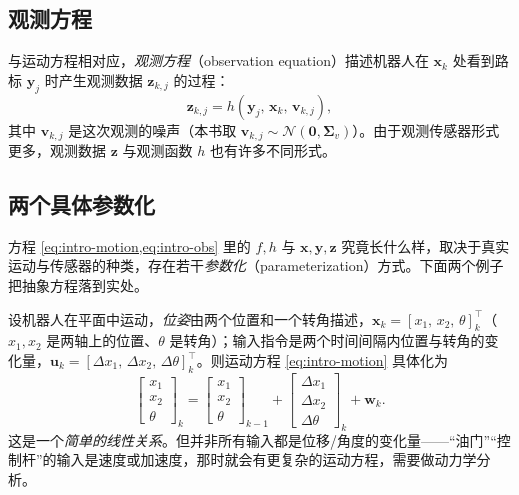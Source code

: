 \subsection{观测方程}
\label{sec:intro-obs}
与运动方程相对应，\emph{观测方程}（observation equation）描述机器人在 $\mathbf{x}_k$ 处看到路标 $\mathbf{y}_j$ 时产生观测数据 $\mathbf{z}_{k,j}$ 的过程\cite{gaoxiang2019slam14}：
\begin{equation}
  \mathbf{z}_{k,j} = h\!\left(\mathbf{y}_j,\, \mathbf{x}_k,\, \mathbf{v}_{k,j}\right),
  \label{eq:intro-obs}
\end{equation}
其中 $\mathbf{v}_{k,j}$ 是这次观测的噪声（本书取 $\mathbf{v}_{k,j}\sim\mathcal{N}(\mathbf{0},\boldsymbol{\Sigma}_v)$）。由于观测传感器形式更多，观测数据 $\mathbf{z}$ 与观测函数 $h$ 也有许多不同形式。

\subsection{两个具体参数化}
\label{sec:intro-param}
方程 \cref{eq:intro-motion,eq:intro-obs} 里的 $f,h$ 与 $\mathbf{x},\mathbf{y},\mathbf{z}$ 究竟长什么样，取决于真实运动与传感器的种类，存在若干\emph{参数化}（parameterization）方式\cite{gaoxiang2019slam14}。下面两个例子把抽象方程落到实处。

\begin{example}\label{ex:intro-planar}
设机器人在平面中运动，\emph{位姿}由两个位置和一个转角描述，$\mathbf{x}_k=[x_1,\,x_2,\,\theta]_k^\top$（$x_1,x_2$ 是两轴上的位置、$\theta$ 是转角）；输入指令是两个时间间隔内位置与转角的变化量，$\mathbf{u}_k=[\Delta x_1,\,\Delta x_2,\,\Delta\theta]_k^\top$。则运动方程 \cref{eq:intro-motion} 具体化为
\begin{equation}
  \begin{bmatrix} x_1\\ x_2\\ \theta \end{bmatrix}_{k}
  =\begin{bmatrix} x_1\\ x_2\\ \theta \end{bmatrix}_{k-1}
  +\begin{bmatrix} \Delta x_1\\ \Delta x_2\\ \Delta\theta \end{bmatrix}_{k}
  +\mathbf{w}_k.
  \label{eq:intro-planar-motion}
\end{equation}
这是一个\emph{简单的线性关系}。但并非所有输入都是位移/角度的变化量——“油门”“控制杆”的输入是速度或加速度，那时就会有更复杂的运动方程，需要做动力学分析。
\end{example}

